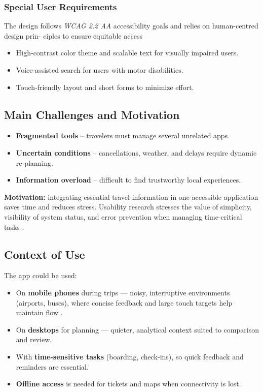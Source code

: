 \documentclass[11pt,a4paper]{article}
\begin{document}
\subsubsection*{Special User Requirements}

The design follows \textit{WCAG 2.2 AA} accessibility goals and relies on human-centred design prin-
ciples to ensure equitable access \cite{iso9241}

\begin{itemize}
  \item High-contrast color theme and scalable text for visually impaired users.
  \item Voice-assisted search for users with motor disabilities.
  \item Touch-friendly layout and short forms to minimize effort.
\end{itemize}

\subsection{Main Challenges and Motivation}
\begin{itemize}
  \item \textbf{Fragmented tools} – travelers must manage several unrelated apps.
  \item \textbf{Uncertain conditions} – cancellations, weather, and delays require dynamic re-planning.
  \item \textbf{Information overload} – difficult to find trustworthy local experiences.
\end{itemize}
\textbf{Motivation:} integrating essential travel information in one accessible application saves time and reduces stress.
Usability research stresses the value of simplicity, visibility of system status, and error prevention when managing time-critical tasks \cite{nielsen1994usability}.

\subsection{Context of Use}
The app could be used:
\begin{itemize}
  \item On \textbf{mobile phones} during trips — noisy, interruptive environments (airports, buses), where concise feedback and large touch targets help maintain flow \cite{nielsen1994usability}.
  \item On \textbf{desktops} for planning — quieter, analytical context suited to comparison and review.
  \item With \textbf{time-sensitive tasks} (boarding, check-ins), so quick feedback and reminders are essential.
  \item \textbf{Offline access} is needed for tickets and maps when connectivity is lost.
\end{itemize}
\end{document}

